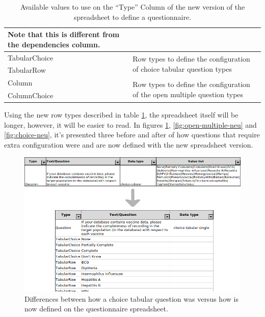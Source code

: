 \begin{table}[H]
\begin{tabular}{| p{.2\linewidth} | p{.8\linewidth} |}
        Note that this is different from the dependencies column. \\ \hline
TabularChoice                 & \multirow{2}{*}{Row types to define the configuration of choice tabular question types}    \\ \cline{1-1}
TabularRow                    &                                                                                            \\ \hline
Column                        & \multirow{2}{*}{Row types to define the configuration of the open multiple question types} \\ \cline{1-1}
ColumnChoice                  &                                                                                            \\ \hline
\end{tabular}
\caption{Available values to use on the ``Type'' Column of the new version of the spreadsheet to define a questionnaire.}
\label{tab:excel-row-types}
\end{table}

Using the new row types described in table \ref{tab:excel-row-types}, the spreadsheet itself will be longer, however, it will be easier to read.
In figures \ref{fig:choice-tabular-neu}, \ref{fig:open-multiple-neu} and \ref{fig:choice-neu}, it's presented three before and after of how questions that require extra configuration were and are now defined with the new spreadsheet version.

\begin{figure}[H]
    \center
    \includegraphics[width=.75\textwidth]{choice-tabular-neu}
    \caption{Differences between how a choice tabular question was versus how is now defined on the questionnaire spreadsheet.}
    \label{fig:choice-tabular-neu}
\end{figure}

